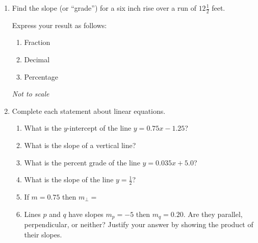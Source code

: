 \documentclass[12pt, twoside]{article}
\begin{document}
\begin{enumerate}
\newpage
\item Find the slope (or ``grade'') for a six inch rise over a run of $12 \frac{1}{2}$ feet.
\begin{multicols}{2}
  Express your result as follows: 
\begin{enumerate}
  \item Fraction
  \item Decimal
  \item Percentage
\end{enumerate}
\begin{flushright}
  \emph{Not to scale}
\end{flushright}
\end{multicols}

\newpage
\item Complete each statement about linear equations.
\begin{enumerate}[itemsep=0.5cm]
  \item What is the $y$-intercept of the line $y = 0.75x - 1.25$?
  \item What is the slope of a vertical line?
  \item What is the percent grade of the line $\displaystyle y = 0.035x + 5.0$?
  \item What is the slope of the line $y=\frac{1}{2}$?
  \item If $m = 0.75$ then $m_{\perp}=$
  \item Lines $p$ and $q$ have slopes $m_p = -5$ then $m_q= 0.20$. Are they parallel, perpendicular, or neither? Justify your answer by showing the product of their slopes.
  \end{enumerate}


\end{enumerate}
\end{document}
